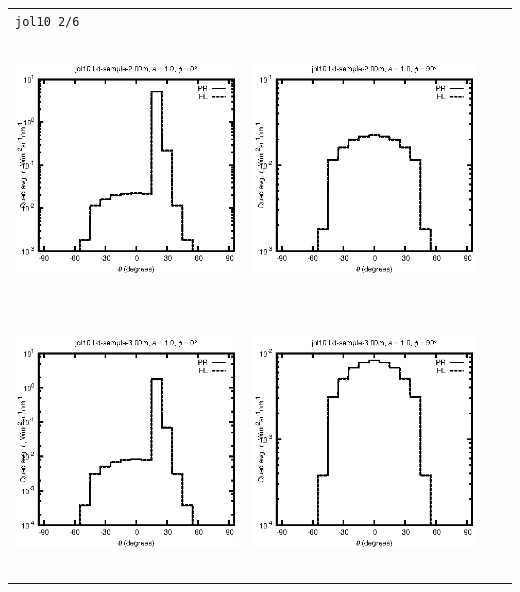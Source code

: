\begin{tabular}{c c c c}
\multicolumn{4}{l}{\texttt{jol10 2/6}} \\
\includegraphics[height=7cm]{../eps/jol10_Ld_sample_2.00m_fwd.eps} &
\includegraphics[height=7cm]{../eps/jol10_Ld_sample_2.00m_cross.eps} \\
\includegraphics[height=7cm]{../eps/jol10_Ld_sample_3.00m_fwd.eps} &
\includegraphics[height=7cm]{../eps/jol10_Ld_sample_3.00m_cross.eps} \\

\end{tabular}
